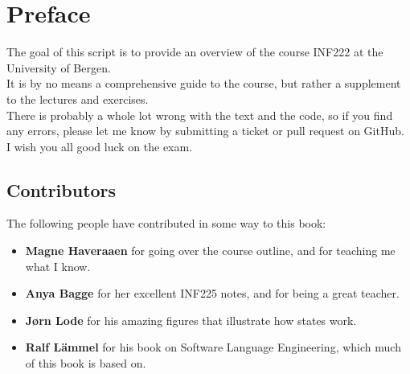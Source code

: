 \section*{Preface}
    The goal of this script is to provide an overview of the course INF222 at the University of Bergen.\\
    It is by no means a comprehensive guide to the course, but rather a supplement to the lectures and exercises.\\
    There is probably a whole lot wrong with the text and the code, so if you find any errors, please let me know by submitting a ticket or pull request on GitHub.\\

    I wish you all good luck on the exam.
    \subsection*{Contributors}
    The following people have contributed in some way to this book:
    \begin{itemize}
        \item \textbf{Magne Haveraaen} for going over the course outline, and for teaching me what I know.
        \item \textbf{Anya Bagge} for her excellent INF225 notes, and for being a great teacher.
        \item \textbf{Jørn Lode} for his amazing figures that illustrate how states work.
        \item \textbf{Ralf Lämmel} for his book on Software Language Engineering, which much of this book is based on.
    \end{itemize}

